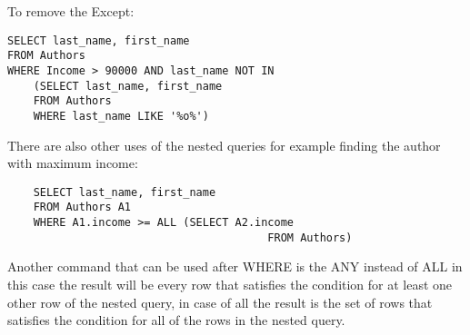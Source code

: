 \documentclass[a4page, 11pt]{article}
\begin{document}
To remove the Except:
\begin{lstlisting}
SELECT last_name, first_name
FROM Authors
WHERE Income > 90000 AND last_name NOT IN 
	(SELECT last_name, first_name
	FROM Authors
	WHERE last_name LIKE '%o%')
\end{lstlisting}
There are also other uses of the nested queries for example finding the author with maximum income:
\begin{lstlisting}
	SELECT last_name, first_name
	FROM Authors A1
	WHERE A1.income >= ALL (SELECT A2.income
										FROM Authors)
\end{lstlisting}
Another command that can be used after WHERE is the ANY instead of ALL in this case the result will be every row that satisfies the condition for at least one other row of the nested query, in case of all the result is the set of rows that satisfies the condition for all of the rows in the nested query.
\end{document}
